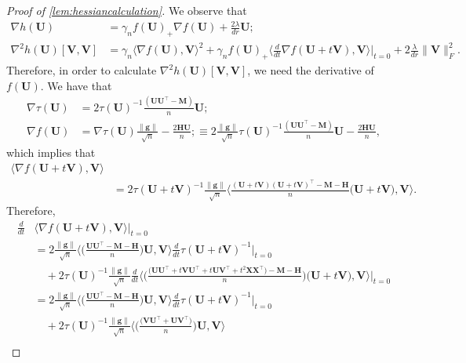 \documentclass[10pt]{article}
\renewcommand{\t}{^{\top}}
\newcommand{\inv}{^{-1}}
\theoremstyle{definition}
\begin{document}
\begin{proof}[Proof of \cref{lem:hessiancalculation}]
We observe that 
    \begin{align}
\nabla h(\bm{U}) &= \gamma_n f(\bm{U})_+ \nabla f(\bm{U}) + \frac{2\lambda}{dr} \bm{U}; \\
\nabla^2 h(\bm{U})[\bm{V},\bm{V}] &= \gamma_n \bigg\langle \nabla f(\bm{U}), \bm{V} \bigg \rangle^2 + \gamma_n f(\bm{U})_+ \bigg\langle \frac{d}{dt} \nabla f(\bm{U} + t \bm{V}), \bm{V} \bigg \rangle \bigg|_{t=0} + 2 \frac{\lambda}{dr} \| \bm{V} \|_F^2.
\end{align}
Therefore, in order to calculate $\nabla^2 h(\bm{U})[\bm{V},\bm{V}]$, we need the derivative of $f(\bm{U})$.  We have that 
\begin{align}
       \nabla \tau(\bm{U}) &= 2 \tau(\bm{U})\inv \frac{(\bm{UU}\t - \bm{M})}{n} \bm{U}; \\
        \nabla f(\bm{U}) &= \nabla \tau(\bm{U}) \frac{\|\bm{g}\|}{\sqrt{n}} - \frac{2 \bm{HU}}{n}; \equiv 2 \frac{\|\bm{g}\|}{\sqrt{n}}\tau(\bm{U})\inv \frac{(\bm{UU}\t - \bm{M})}{n} \bm{U}  - \frac{2 \bm{HU}}{n},
        \end{align}
    which implies that
    \begin{align}
    \langle \nabla f(\bm{U} + t \bm{V}), \bm{V} \rangle \\&= 2 \tau(\bm{U} + t \bm{V})\inv \frac{\|\bm{g}\|}{\sqrt{n}} \bigg \langle \frac{(\bm{U} + t \bm{V}) (\bm{U} + t \bm{V})\t - \bm{M} - \bm{H}}{n} \big( \bm{U} + t \bm{V} \big), \bm{V} \bigg\rangle.
    \end{align}
    Therefore,
    \begin{align}
     \frac{d}{dt}  &\langle \nabla f(\bm{U} + t \bm{V}), \bm{V} \rangle \bigg|_{t=0} \\
     &=  2  \frac{\|\bm{g}\|}{\sqrt{n}} \bigg\langle \bigg(\frac{ \bm{UU}\t  - \bm{M} - \bm{H}}{n}  \bigg)  \bm{U}  , \bm{V} \bigg \rangle \frac{d}{dt} \tau(\bm{U} + t \bm{V})\inv \bigg|_{t=0} \\
    &\quad + 2\tau(\bm{U})\inv \frac{\|\bm{g}\|}{\sqrt{n}} \frac{d}{dt} \bigg\langle \bigg(  \frac{\big(\bm{UU}\t + t \bm{VU}\t + t \bm{UV}\t + t^2 \bm{XX}\t\big) - \bm{M} - \bm{H}}{n}  \bigg)\big( \bm{U} + t \bm{V} \big), \bm{V} \bigg \rangle \bigg|_{t=0} \\
    &= 2\frac{\|\bm{g}\|}{\sqrt{n}} \bigg\langle \bigg(\frac{ \bm{UU}\t  - \bm{M}- \bm{H}}{n}  \bigg)  \bm{U}  , \bm{V} \bigg \rangle \frac{d}{dt} \tau(\bm{U} + t \bm{V})\inv \bigg|_{t=0} \\
    &\quad + 2\tau(\bm{U})\inv \frac{\|\bm{g}\|}{\sqrt{n}}  \bigg\langle \bigg(  \frac{\big(  \bm{VU}\t +  \bm{UV}\t \big) }{n}  \bigg)\bm{U}, \bm{V} \bigg \rangle \\

\end{align}
\end{proof}
\end{document}
